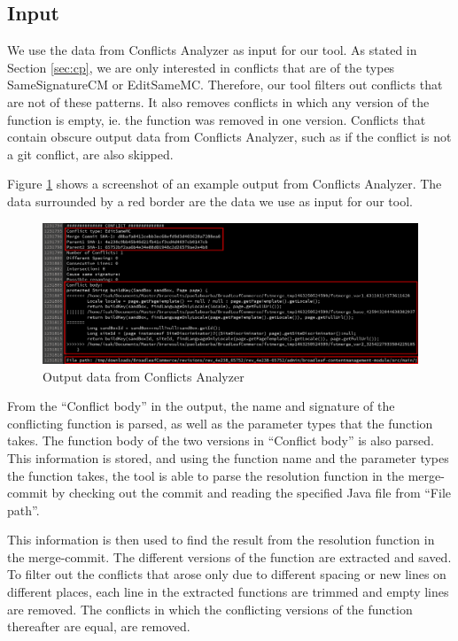\subsection{Input}
We use the data from Conflicts Analyzer as input for our tool. As stated in Section \ref{sec:cp}, we are only interested in conflicts that are of the types SameSignatureCM or EditSameMC. Therefore, our tool filters out conflicts that are not of these patterns. It also removes conflicts in which any version of the function is empty, ie. the function was removed in one version. Conflicts that contain obscure output data from Conflicts Analyzer, such as if the conflict is not a git conflict, are also skipped.

Figure \ref{fig:screenshot} shows a screenshot of an example output from Conflicts Analyzer. The data surrounded by a red border are the data we use as input for our tool.
\begin{figure}[H]
\centering
\includegraphics[width=400pt]{figure/screenshot.png}
\caption{Output data from Conflicts Analyzer}\label{fig:screenshot}
\end{figure}

From the “Conflict body” in the output, the name and signature of the conflicting function is parsed, as well as the parameter types that the function takes. The function body of the two versions in “Conflict body” is also parsed. This information is stored, and using the function name and the parameter types the function takes, the tool is able to parse the resolution function in the merge-commit by checking out the commit and reading the specified Java file from “File path”.

This information is then used to find the result from the resolution function in the merge-commit. The different versions of the function are extracted and saved. To filter out the conflicts that arose only due to different spacing or new lines on different places, each line in the extracted functions are trimmed and empty lines are removed. The conflicts in which the conflicting versions of the function thereafter are equal, are removed.

